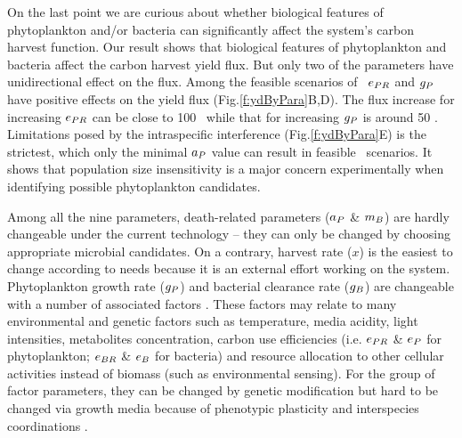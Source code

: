 \documentclass[../thesis.tex]{subfiles} %
\begin{document}
On the last point we are curious about whether biological features of phytoplankton and/or bacteria can significantly affect the system’s carbon harvest function.  Our result shows that biological features of phytoplankton and bacteria affect the carbon harvest yield flux.  But only two of the parameters have unidirectional effect on the flux.  Among the feasible scenarios of \PBH\, $e_{PR}$ and $g_P$ have positive effects on the yield flux (Fig.\ref{f:ydByPara}B,D).  The flux increase for increasing $e_{PR}$ can be close to 100 \dxdt\ while that for increasing $g_P$ is around 50 \dxdt.  Limitations posed by the intraspecific interference (Fig.\ref{f:ydByPara}E) is the strictest, which only the minimal $a_P$ value can result in feasible \PBH\ scenarios.  It shows that population size insensitivity is a major concern experimentally when identifying possible phytoplankton candidates.

Among all the nine parameters, death-related parameters ($a_P$ \& $m_B$) are hardly changeable under the current technology -- they can only be changed by choosing appropriate microbial candidates.  On a contrary, harvest rate ($x$) is the easiest to change according to needs because it is an external effort working on the system.  Phytoplankton growth rate ($g_P$) and bacterial clearance rate ($g_B$) are changeable with a number of associated factors \autocite{park2020potential}.  These factors may relate to many environmental and genetic factors such as temperature, media acidity, light intensities, metabolites concentration, carbon use efficiencies (i.e. $e_{PR}$ \& $e_P$ for phytoplankton; $e_{BR}$ \& $e_B$ for bacteria) and resource allocation to other cellular activities instead of biomass (such as environmental sensing).  For the group of factor parameters, they can be changed by genetic modification \autocite{moniruzzaman1996ethanol} but hard to be changed via growth media because of phenotypic plasticity \autocite{j1989respiration,bratbak1985phytoplankton,samejima1958heterotrophic} and interspecies coordinations \autocite{beliaev2014inference,amin2012interactions}.
\end{document}
